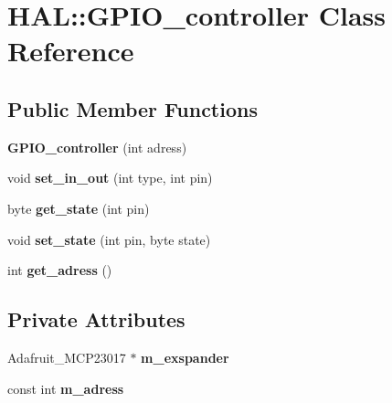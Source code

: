 \hypertarget{class_h_a_l_1_1_g_p_i_o__controller}{}\section{H\+AL\+:\+:G\+P\+I\+O\+\_\+controller Class Reference}
\label{class_h_a_l_1_1_g_p_i_o__controller}
\subsection*{Public Member Functions}
\begin{DoxyCompactItemize}
\item 
\mbox{\label{class_h_a_l_1_1_g_p_i_o__controller_a22bd673236951775003b6f6c8b9eb961}} 
{\bfseries G\+P\+I\+O\+\_\+controller} (int adress)
\item 
\mbox{\label{class_h_a_l_1_1_g_p_i_o__controller_a5644ac41b77376b3afbe052cf2627ceb}} 
void {\bfseries set\+\_\+in\+\_\+out} (int type, int pin)
\item 
\mbox{\label{class_h_a_l_1_1_g_p_i_o__controller_a018cbdd057d0b358b9d76999171a3ea0}} 
byte {\bfseries get\+\_\+state} (int pin)
\item 
\mbox{\label{class_h_a_l_1_1_g_p_i_o__controller_a892bc5bb354276b3886f20be6074940f}} 
void {\bfseries set\+\_\+state} (int pin, byte state)
\item 
\mbox{\label{class_h_a_l_1_1_g_p_i_o__controller_a4bcdde1844d0c7b218e20d8f439c2089}} 
int {\bfseries get\+\_\+adress} ()
\end{DoxyCompactItemize}
\subsection*{Private Attributes}
\begin{DoxyCompactItemize}
\item 
\mbox{\label{class_h_a_l_1_1_g_p_i_o__controller_a07c9570d9819e515b34c8a3fd9c34365}} 
Adafruit\+\_\+\+M\+C\+P23017 $\ast$ {\bfseries m\+\_\+exspander}
\item 
\mbox{\label{class_h_a_l_1_1_g_p_i_o__controller_a8114eff616738a2455831114b0f9d070}} 
const int {\bfseries m\+\_\+adress}
\end{DoxyCompactItemize}


